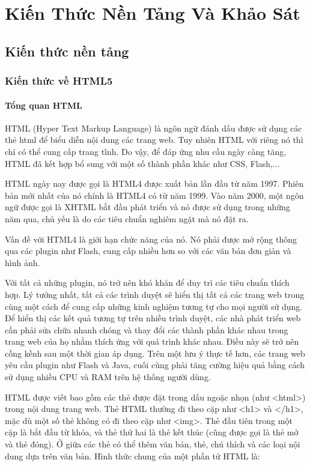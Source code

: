 \chapter{Kiến Thức Nền Tảng Và Khảo Sát}
\ifpdf
    \graphicspath{{Chapter2/Chapter2Figs/PNG/}{Chapter2/Chapter2Figs/PDF/}{Chapter2/Chapter2Figs/}}
\else
    \graphicspath{{Chapter2/Chapter2Figs/EPS/}{Chapter2/Chapter2Figs/}}
\fi
\section{Kiến thức nền tảng}
\subsection{Kiến thức về HTML5}
\subsubsection{Tổng quan HTML}
HTML (Hyper Text Markup Language) là ngôn ngữ đánh dấu được sử dụng các thẻ html để biểu diễn nội dung các trang web. Tuy nhiên HTML với riêng nó thì chỉ có thể cung cấp trang tĩnh. Do vậy, để đáp ứng nhu cầu ngày càng tăng, HTML đã kết hợp bổ sung với một số thành phần khác như CSS, Flash,...

HTML ngày nay được gọi là HTML4 được xuất bản lần đầu từ năm 1997. Phiên bản mới nhất của nó chính là HTML4 có từ năm 1999. Vào năm 2000, một ngôn ngữ được gọi là XHTML bắt đầu phát triển và nó được sử dụng trong những năm qua, chủ yếu là do các tiêu chuẩn nghiêm ngặt mà nó đặt ra.

Vấn đề với HTML4 là giới hạn chức năng của nó. Nó phải được mở rộng thông qua các plugin như Flash, cung cấp nhiều hơn so với các văn bản đơn giản và hình ảnh.

Với tất cả những plugin, nó trở nên khó khăn để duy trì các tiêu chuẩn thích hợp. Lý tưởng nhất, tất cả các trình duyệt sẽ hiển thị tất cả các trang web trong cùng một cách để cung cấp những kinh nghiệm tương tự cho mọi người sử dụng. Để hiển thị các kết quả tương tự trên nhiều trình duyệt, các nhà phát triển web cần phải sửa chữa nhanh chóng và thay đổi các thành phần khác nhau trong trang web của họ nhằm thích ứng với quá trình khác nhau. Điều này sẽ trở nên cồng kềnh sau một thời gian áp dụng. Trên một lưu ý thực tế hơn, các trang web yêu cầu plugin như Flash và Java, cuối cùng phải tăng cường hiệu quả bằng cách sử dụng nhiều CPU và RAM trên hệ thống người dùng.

HTML được viết bao gồm các thẻ được đặt trong dấu ngoặc nhọn (như <html>) trong nội dung trang web. Thẻ HTML thường đi theo cặp như <h1> và </h1>, mặc dù một số thẻ không có đi theo cặp như <img>. Thẻ đầu tiên trong một cặp là bắt đầu từ khóa, và thẻ thứ hai là thẻ kết thúc (cũng được gọi là thẻ mở và thẻ đóng). Ở giữa các thẻ có thể thêm văn bản, thẻ, chú thích và các loại nội dung dựa trên văn bản.
Hình thức chung của một phần tử HTML là:

